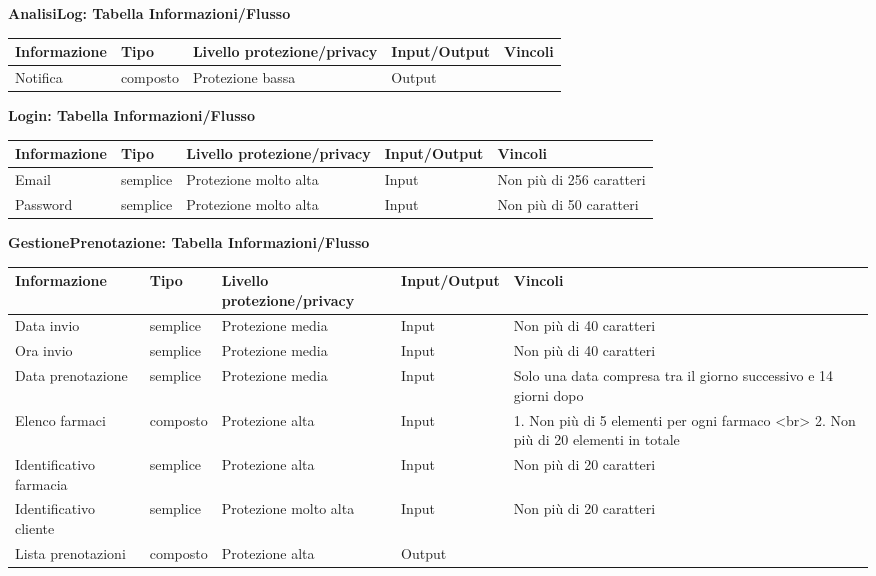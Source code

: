 \textbf{AnalisiLog: Tabella Informazioni/Flusso}
\hfill \break

\begin{tabular} {|P{3cm}|P{3cm}|P{3cm}|P{3cm}|P{3cm}|}
    \hline
    \textbf{Informazione} & \textbf{Tipo} & \textbf{Livello protezione/privacy} & \textbf{Input/Output} & \textbf{Vincoli} \\
    \hline
    Notifica & composto & Protezione bassa & Output &  \\
    \hline
\end{tabular}

\textbf{Login: Tabella Informazioni/Flusso}
\hfill \break

\begin{tabular} {|P{3cm}|P{3cm}|P{3cm}|P{3cm}|P{3cm}|}
    \hline
    \textbf{Informazione} & \textbf{Tipo} & \textbf{Livello protezione/privacy} & \textbf{Input/Output} & \textbf{Vincoli} \\
    \hline
    Email & semplice & Protezione molto alta & Input & Non più di 256 caratteri \\
    \hline
    Password & semplice & Protezione molto alta & Input & Non più di 50 caratteri \\
    \hline
\end{tabular}
\hfill \break
\hfill \break

\textbf{GestionePrenotazione: Tabella Informazioni/Flusso}
\hfill \break

\begin{tabular} {|P{3cm}|P{3cm}|P{3cm}|P{3cm}|P{3cm}|}
    \hline
    \textbf{Informazione} & \textbf{Tipo} & \textbf{Livello protezione/privacy} & \textbf{Input/Output} & \textbf{Vincoli} \\
    \hline
    Data invio & semplice & Protezione media & Input & Non più di 40 caratteri \\
    \hline
    Ora invio & semplice & Protezione media & Input & Non più di 40 caratteri \\
    \hline
    Data prenotazione & semplice & Protezione media & Input & Solo una data compresa tra il giorno successivo e 14 giorni dopo \\
    \hline
    Elenco farmaci & composto & Protezione alta & Input & 1. Non più di 5 elementi per ogni farmaco <br> 2. Non più di 20 elementi in totale \\
    \hline
    Identificativo farmacia & semplice & Protezione alta & Input & Non più di 20 caratteri \\
    \hline
    Identificativo cliente & semplice & Protezione molto alta & Input & Non più di 20 caratteri \\
    \hline
    Lista prenotazioni  &  composto  &  Protezione alta  &  Output  &  \\
    \hline
\end{tabular}

